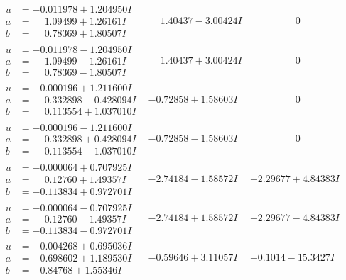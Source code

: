 \documentclass[1p]{elsarticle_modified}
\theoremstyle{definition}
\begin{document}
$$\begin{array}{c|c|c}
\begin{aligned}
u &= -0.011978 + 1.204950 I \\
a &= \phantom{-}1.09499 + 1.26161 I \\
b &= \phantom{-}0.78369 + 1.80507 I\end{aligned}
 & \phantom{-}1.40437 - 3.00424 I & \phantom{-0.000000 } 0 \\ \hline\begin{aligned}
u &= -0.011978 - 1.204950 I \\
a &= \phantom{-}1.09499 - 1.26161 I \\
b &= \phantom{-}0.78369 - 1.80507 I\end{aligned}
 & \phantom{-}1.40437 + 3.00424 I & \phantom{-0.000000 } 0 \\ \hline\begin{aligned}
u &= -0.000196 + 1.211600 I \\
a &= \phantom{-}0.332898 - 0.428094 I \\
b &= \phantom{-}0.113554 + 1.037010 I\end{aligned}
 & -0.72858 + 1.58603 I & \phantom{-0.000000 } 0 \\ \hline\begin{aligned}
u &= -0.000196 - 1.211600 I \\
a &= \phantom{-}0.332898 + 0.428094 I \\
b &= \phantom{-}0.113554 - 1.037010 I\end{aligned}
 & -0.72858 - 1.58603 I & \phantom{-0.000000 } 0 \\ \hline\begin{aligned}
u &= -0.000064 + 0.707925 I \\
a &= \phantom{-}0.12760 + 1.49357 I \\
b &= -0.113834 + 0.972701 I\end{aligned}
 & -2.74184 - 1.58572 I & -2.29677 + 4.84383 I \\ \hline\begin{aligned}
u &= -0.000064 - 0.707925 I \\
a &= \phantom{-}0.12760 - 1.49357 I \\
b &= -0.113834 - 0.972701 I\end{aligned}
 & -2.74184 + 1.58572 I & -2.29677 - 4.84383 I \\ \hline\begin{aligned}
u &= -0.004268 + 0.695036 I \\
a &= -0.698602 + 1.189530 I \\
b &= -0.84768 + 1.55346 I\end{aligned}
 & -0.59646 + 3.11057 I & -0.1014 - 15.3427 I \\ \hline\begin{aligned}

\end{aligned}
\end{array}$$
\end{document}

